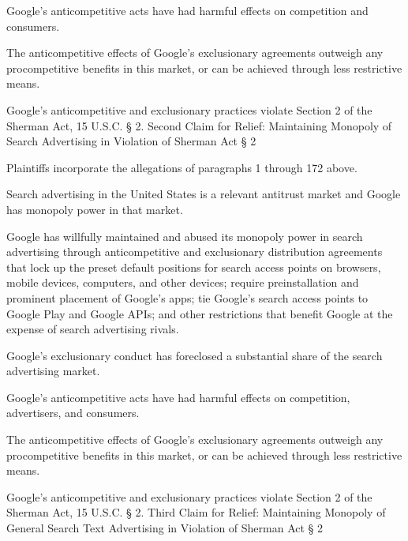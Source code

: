 \documentclass[11pt,b5paper]{scrartcl}
\begin{document}
Google’s anticompetitive acts have had harmful effects on competition and
consumers.


The anticompetitive effects of Google’s exclusionary agreements outweigh any
procompetitive benefits in this market, or can be achieved through less restrictive means.


Google’s anticompetitive and exclusionary practices violate Section 2 of the
Sherman Act, 15 U.S.C. § 2.
Second Claim for Relief: Maintaining Monopoly of Search Advertising in Violation of
Sherman Act § 2


Plaintiffs incorporate the allegations of paragraphs 1 through 172 above.


Search advertising in the United States is a relevant antitrust market and Google
has monopoly power in that market.


Google has willfully maintained and abused its monopoly power in search
advertising through anticompetitive and exclusionary distribution agreements that lock up the
preset default positions for search access points on browsers, mobile devices, computers, and
other devices; require preinstallation and prominent placement of Google’s apps; tie Google’s
search access points to Google Play and Google APIs; and other restrictions that benefit Google
at the expense of search advertising rivals.


Google’s exclusionary conduct has foreclosed a substantial share of the search
advertising market.


Google’s anticompetitive acts have had harmful effects on competition,
advertisers, and consumers.


The anticompetitive effects of Google’s exclusionary agreements outweigh any
procompetitive benefits in this market, or can be achieved through less restrictive means.


Google’s anticompetitive and exclusionary practices violate Section 2 of the
Sherman Act, 15 U.S.C. § 2.
Third Claim for Relief: Maintaining Monopoly of General Search Text Advertising in
Violation of Sherman Act § 2
\end{document}

